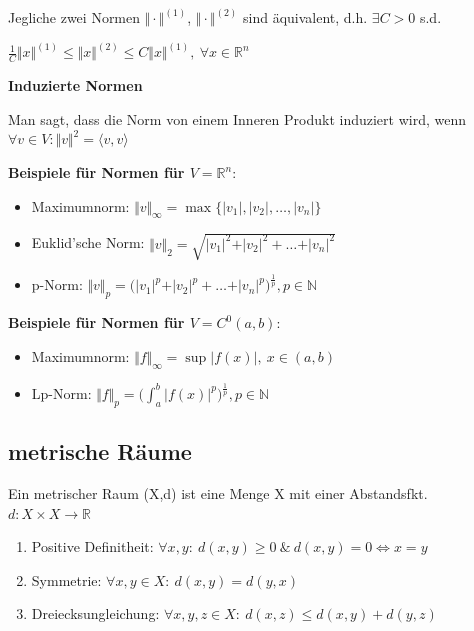 \documentclass[8pt, a4paper, landscape, fleqn]{scrartcl}
\newenvironment {example}
				{\begin{itshape} \begin{small}}
				{\end{small} \end{itshape}}
\def\R{\mathbb{R}}
\newcommand{\abs}[1]{\vert#1\vert}
\begin{document}
\begin{multicols*}{3}
					Jegliche zwei Normen $\Vert \cdot \Vert ^{(1)}$, $\Vert \cdot \Vert ^{(2)}$ sind äquivalent, d.h. $\exists C > 0$ s.d.
					
					$\frac{1}{C} \Vert x \Vert^{(1)} \leq \Vert x \Vert ^{(2)} \leq C \Vert x \Vert ^{(1)}, \ \forall x \in \R ^n$
					
					\textbf{Induzierte Normen}
					
					Man sagt, dass die Norm von einem Inneren Produkt induziert wird, wenn $\forall v\in V: \Vert v\Vert^2=\langle v,v\rangle$\\[4pt]
					\begin{example}
				 	    \textbf{Beispiele für Normen für $V=\mathbb{R}^n:$}
				 	    \begin{itemize}
				 		    \item Maximumnorm: $\Vert v\Vert_\infty=\max\{\abs{v_1},\abs{v_2},\dots,\abs{v_n}\}$
						    \item Euklid'sche Norm: $\Vert v\Vert_2=\sqrt{\abs{v_1}^2+\abs{v_2}^2+\dots+\abs{v_n}^2}$
						    \item p-Norm: $\Vert v\Vert_p=\big(\abs{v_1}^p+\abs{v_2}^p+\dots+\abs{v_n}^p)^{\frac{1}{p}},p\in\mathbb{N}$	
				 	    \end{itemize}
				 	    \textbf{Beispiele für Normen für $V=C^0(a,b):$}
					    \begin{itemize}
						    \item Maximumnorm: $\Vert f\Vert_\infty=\sup\abs{f(x)},\ x\in(a,b)$
						    \item Lp-Norm: $\Vert f\Vert_p=\Big(\int_a^b\abs{f(x)}^p\Big)^{\frac{1}{p}},p\in\mathbb{N}$
					    \end{itemize}
				    \end{example}
				\subsection{metrische Räume}
					Ein metrischer Raum (X,d) ist eine Menge X mit  einer Abstandsfkt.\\
					$d:X\times X\rightarrow\mathbb{R}$
					\begin{enumerate}
						\item Positive Definitheit: $\forall x,y:\ d(x,y)\ge0\ \& \ d(x,y)=0\Leftrightarrow x=y$
						\item Symmetrie: $\forall x,y\in X:\ d(x,y)=d(y,x)$
						\item Dreiecksungleichung: $\forall x,y,z\in X:\ d(x,z)\le d(x,y)+d(y,z)$
					\end{enumerate}

\end{multicols*}
\end{document}

